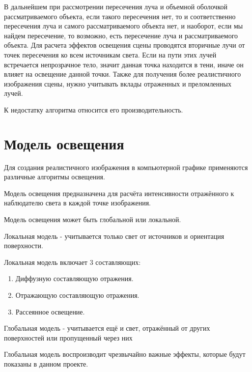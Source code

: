 В дальнейшем при рассмотрении пересечения луча и объемной оболочкой рассматриваемого объекта, если такого пересечения нет, то и соответственно пересечения луча и самого рассматриваемого объекта нет, и наоборот, если мы найдем пересечение, то возможно, есть пересечение луча и рассматриваемого объекта. Для расчета эффектов освещения сцены проводятся вторичные лучи от точек пересечения ко всем источникам света. Если на пути этих лучей встречается непрозрачное тело, значит данная точка находится в тени, иначе он влияет на освещение данной точки. Также для получения более реалистичного изображения сцены, нужно учитывать вклады отраженных и преломленных лучей. 
 
К недостатку алгоритма относится его производительность. 

\section {Модель освещения}

Для создания реалистичного изображения в компьютерной графике применяются различные алгоритмы освещения.

Модель освещения предназначена для расчёта интенсивности
отражённого к наблюдателю света в каждой точке изображения.

Модель освещения может быть глобальной или локальной.

Локальная модель - учитывается только свет от источников и ориентация поверхности.

Локальная модель включает 3 составляющих: 

\begin{enumerate}
	\item Диффузную составляющую отражения.
	\item Отражающую составляющую отражения.
	\item Рассеянное освещение.
\end{enumerate}

Глобальная модель - учитывается ещё и свет, отражённый от других поверхностей или пропущенный через них

Глобальная модель воспроизводит чрезвычайно важные эффекты, которые будут показаны в данном проекте.


